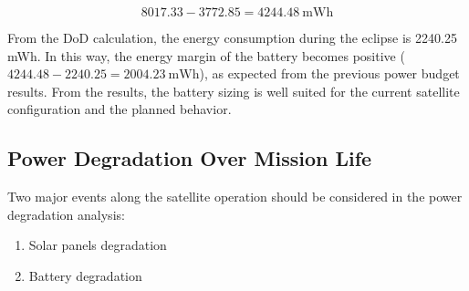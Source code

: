 \begin{equation} \label{eq:energy-input-sun-light}
    8017.33 - 3772.85 = \SI{4244.48}{\milli\W\hour}
\end{equation}
\vspace{0.1cm}

From the \ac{DoD} calculation, the energy consumption during the eclipse is 2240.25 mWh. In this way, the energy margin of the battery becomes positive ($ 4244.48 - 2240.25 = \SI{2004.23}{\milli\W\hour}$), as expected from the previous power budget results. From the results, the battery sizing is well suited for the current satellite configuration and the planned behavior.


\subsection{Power Degradation Over Mission Life}

Two major events along the satellite operation should be considered in the power degradation analysis:

\begin{enumerate}
    \item Solar panels degradation
    \item Battery degradation
\end{enumerate}

